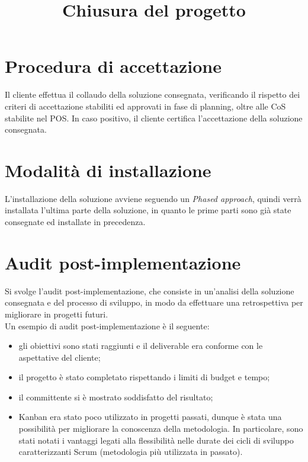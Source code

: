 \documentclass[a4paper,12pt]{article}
\title{\textbf{Chiusura del progetto}}
\author{}
\date{}
\begin{document}
\maketitle
\tableofcontents

\newpage

\section{Procedura di accettazione}
Il cliente effettua il collaudo della soluzione consegnata, verificando il rispetto dei criteri di accettazione
stabiliti ed approvati in fase di planning, oltre alle CoS stabilite nel POS. In caso positivo, il cliente certifica
l'accettazione della soluzione consegnata.

\section{Modalità di installazione}
L'installazione della soluzione avviene seguendo un \textit{Phased approach}, quindi verrà installata l'ultima parte
della soluzione, in quanto le prime parti sono già state consegnate ed installate in precedenza.

\section{Audit post-implementazione}
Si svolge l'audit post-implementazione, che consiste in un'analisi della soluzione consegnata e del processo di
sviluppo, in modo da effettuare una retrospettiva per migliorare in progetti futuri. \\
Un esempio di audit post-implementazione è il seguente:
\begin{itemize}
    \item gli obiettivi sono stati raggiunti e il deliverable era conforme con le aspettative del cliente;
    \item il progetto è stato completato rispettando i limiti di budget e tempo;
    \item il committente si è mostrato soddisfatto del risultato;
    \item Kanban era stato poco utilizzato in progetti passati, dunque è stata una possibilità per migliorare la
    conoscenza della metodologia. In particolare, sono stati notati i vantaggi legati alla flessibilità nelle durate
    dei cicli di sviluppo caratterizzanti Scrum (metodologia più utilizzata in passato).
\end{itemize} 
\end{document}
